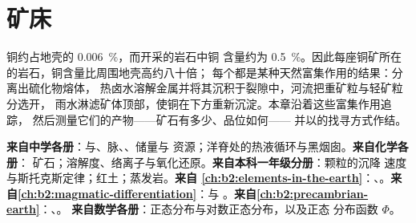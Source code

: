\chapter{矿床}\label{ch:b2:ore-deposits}

铜约占地壳的 \qty{0.006}{\percent}，而开采的岩石中铜
含量约为 \qty{0.5}{\percent}。因此每座铜矿所在的岩石，铜含量比周围地壳高约八十倍；
每个都是某种天然富集作用的结果：分离出硫化物熔体，
热卤水溶解金属并将其沉积于裂隙中，河流把重矿粒与轻矿粒分选开，
雨水淋滤矿体顶部，使铜在下方重新沉淀。本章沿着这些富集作用追踪，
然后测量它们的产物——矿石有多少、品位如何——
并以的找寻方式作结。

\begin{recall}
\textbf{来自中学各册}：与、脉、、储量与
资源；洋脊处的热液循环与黑烟囱。\textbf{来自化学各册}：
矿石；溶解度、络离子与氧化还原。\textbf{来自本科一年级分册}：颗粒的沉降
速度与斯托克斯定律；红土；蒸发岩。\textbf{来自
\cref{ch:b2:elements-in-the-earth}}：、。\textbf{来自\cref{ch:b2:magmatic-differentiation}}：与
。\textbf{来自\cref{ch:b2:precambrian-earth}}：、。
\textbf{来自数学各册}：正态分布与对数正态分布，以及正态
分布函数 $\Phi$。
\end{recall}

